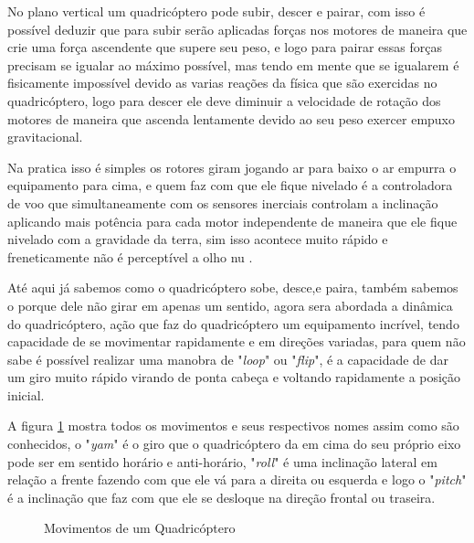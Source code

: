 No plano vertical um quadricóptero pode subir, descer e pairar, com isso é possível deduzir que para subir serão aplicadas forças nos motores de maneira que crie uma força ascendente que supere seu peso, e logo para pairar essas forças precisam se igualar ao máximo possível, mas tendo em mente que se igualarem é fisicamente impossível devido as varias reações da física que são exercidas no quadricóptero, logo para descer ele deve diminuir a velocidade de rotação dos motores de maneira que ascenda lentamente devido ao seu peso exercer empuxo gravitacional. 

Na pratica isso é simples os rotores giram jogando ar para baixo o ar empurra o equipamento para cima, e quem faz com que ele fique nivelado é a controladora de voo que simultaneamente com os sensores inerciais controlam a inclinação aplicando mais potência para cada motor independente de maneira que ele fique nivelado com a gravidade da terra, sim isso acontece muito rápido e freneticamente não é perceptível a olho nu \cite{forcecontrol}. 

Até aqui já sabemos como o quadricóptero sobe, desce,e paira, também sabemos o porque dele não girar em apenas um sentido, agora sera abordada a dinâmica do quadricóptero, ação que faz do quadricóptero um equipamento incrível, tendo capacidade de se movimentar rapidamente e em direções variadas, para quem não sabe é possível realizar uma manobra de "\textit{loop}" ou "\textit{flip}", é a capacidade de dar um giro muito rápido virando de ponta cabeça e voltando rapidamente a posição inicial. 

A figura \ref{fig:yamrollpitch} mostra todos os movimentos e seus respectivos nomes assim como são conhecidos, o "\textit{yam}" é o giro que o quadricóptero da em cima do seu próprio eixo pode ser em sentido horário e anti-horário, "\textit{roll}" é uma inclinação lateral em relação a frente fazendo com que ele vá para a direita ou esquerda e logo o "\textit{pitch}" é a inclinação que faz com que ele se desloque na direção frontal ou traseira. 

\begin{figure}[H]
	\centering
	\caption{Movimentos de um Quadricóptero}
	\fontsize{9pt}{12pt}\selectfont
	\def\svgwidth{15cm}
	
	\label{fig:yamrollpitch}
\end{figure}

